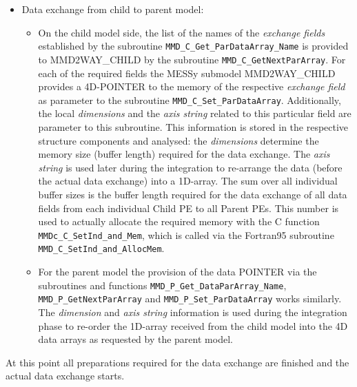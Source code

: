 \documentclass[twoside]{article}
\begin{document}
\begin{itemize}
\begin{itemize}
\begin{itemize}
\item Data exchange from child to parent model:
\begin{itemize}
\item On the child model side, the list 
of the names of the {\it exchange fields} established by the subroutine 
\verb|MMD_C_Get_ParDataArray_Name| is provided to MMD2WAY\_CHILD by the
subroutine \verb|MMD_C_GetNextParArray|. For each of the required fields 
the MESSy submodel MMD2WAY\_CHILD provides a 4D-{\footnotesize POINTER} to the 
memory of the respective {\it exchange field}
as parameter to the subroutine \verb|MMD_C_Set_ParDataArray|. Additionally,
 the local {\it dimensions} and the {\it axis string} related to this particular
 field are parameter to this subroutine. This information is stored in the 
respective structure components and analysed: the {\it dimensions} determine the
 memory size (buffer length) required for the data exchange.
The {\it axis string} is used later during the integration to
re-arrange the data  
(before the actual data exchange) into a 1D-array. The sum over all individual 
buffer sizes is the buffer length required for the data exchange of all data 
fields from each individual Child PE to all Parent PEs. This number is used to 
actually allocate the required memory with the C function 
\verb|MMDc_C_SetInd_and_Mem|, which is called via the Fortran95 subroutine 
\verb|MMD_C_SetInd_and_AllocMem|. 
\item For the parent model the provision of the data {\footnotesize POINTER}
via the  
subroutines and functions \verb|MMD_P_Get_DataParArray_Name|, 
\verb|MMD_P_GetNextParArray| and  \verb|MMD_P_Set_ParDataArray|
works similarly. 
The {\it dimension} and {\it axis string} information is used during the 
integration phase to re-order the 1D-array received from the child model into
the 4D data arrays as requested by the parent model.
\end{itemize}

\end{itemize}
\end{itemize}

\end{itemize}
At this point all preparations required for the data exchange are finished
and the actual data exchange starts.
\end{document}
